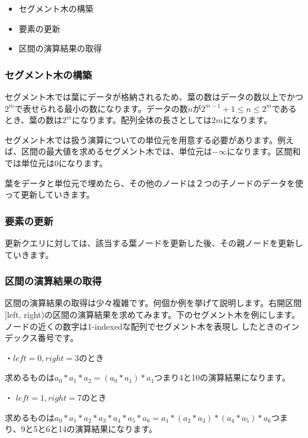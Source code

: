 \begin{itemize}
	\item セグメント木の構築
	\item 要素の更新
	\item 区間の演算結果の取得
\end{itemize}

\subsubsection{セグメント木の構築}
\indent セグメント木では葉にデータが格納されるため、葉の数はデータの数以上でかつ$2^m$で表せられる最小の数になります。データの数$n$が$2^{m-1} + 1 \leq n \leq 2^m$であるとき、葉の数は$2^m$になります。配列全体の長さとしては$2 m$になります。

セグメント木では扱う演算についての単位元を用意する必要があります。例えば、区間の最大値を求めるセグメント木では、単位元は$-\infty$になります。区間和では単位元は0になります。

葉をデータと単位元で埋めたら、その他のノードは２つの子ノードのデータを使って更新していきます。

\subsubsection{要素の更新}
更新クエリに対しては、該当する葉ノードを更新した後、その親ノードを更新していきます。

\subsubsection{区間の演算結果の取得}
区間の演算結果の取得は少々複雑です。何個か例を挙げて説明します。右開区間[left, right)の区間の演算結果を求めてみます。下のセグメント木を例にします。ノードの近くの数字は1-indexedな配列でセグメント木を表現し
したときのインデックス番号です。

・$left = 0, right = 3$のとき

求めるものは$a_0 * a_1 * a_2 = (a_0 * a_1) * a_1$つまり4と10の演算結果になります。 

・ $left = 1, right = 7$のとき

求めるものは$a_0 * a_1 * a_2 * a_3 * a_4 * a_5 * a_6 = a_1 * (a_2 * a_3) * (a_4 * a_5) * a_6$つまり、9と5と6と14の演算結果になります。

\vspace{1cm}

